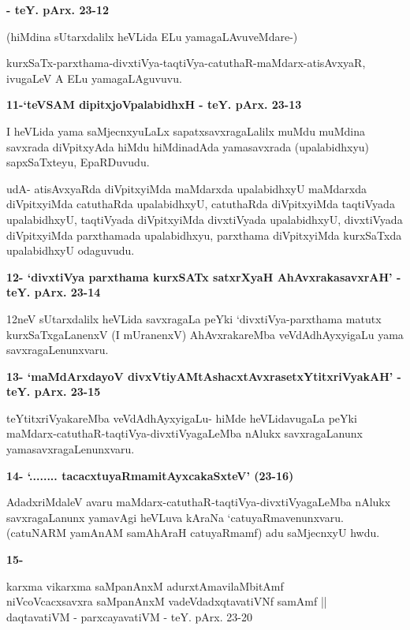 \textbf{- teY. pArx. 23-12}

\smallskip
(hiMdina sUtarxdalilx heVLida ELu yamagaLAvuveMdare-)

kurxSaTx-parxthama-divxtiVya-taqtiVya-catuthaR-maMdarx-atisAvxyaR, ivugaLeV A ELu yamagaLAgu\-vuvu.

\eject

\noindent
\textbf{11-`teVSAM dipitxjoVpalabidhxH - teY. pArx. 23-13}

\smallskip
I heVLida yama saMjecnxyuLaLx sapatxsavxragaLalilx muMdu muMdina savxrada diVpitx\-yAda hiMdu hiMdina\-dAda yamasavxrada (upalabidhxyu) sapxSaTxteyu, EpaRDu\-vudu. 

udA- atisAvxyaRda diVpitx\-yiMda maMdarxda upalabidhxyU maMdarxda diVpitxyiMda catuthaRda upalabidhxyU, catuthaRda diVpitxyiMda taqtiV\-yada upalabidhxyU, taqtiVyada diVpitxyiMda divxtiVyada upalabidhxyU, divxtiVyada diVpitx\-yiMda parxtha\-mada upalabidhxyu, parxthama diVpitxyiMda kurxSaTxda upalabidhxyU odaguvudu.

\medskip
\noindent
\textbf{12- `divxtiVya parxthama kurxSATx satxrXyaH AhAvxrakasavxrAH' - teY. pArx. 23-14}

\smallskip
12neV sUtarxdalilx heVLida savxragaLa peYki `divxtiVya-parxthama matutx kurxSaTxgaLanenxV (I mUranenxV) AhAvxraka\-reMba veVdAdhAyxyigaLu yama savxragaLenunxvaru.

\medskip
\noindent
\textbf{13- `maMdArxdayoV divxVtiyAMtAshacxtAvxrasetxYtitxriVyakAH' - teY. pArx. 23-15}

\smallskip
teYtitxriVyakareMba veVdAdhAyxyigaLu- hiMde heVLidavugaLa peYki maMdarx-\-catuthaR-taqtiVya-divxtiV\-ya\-gaLeMba nAlukx savxragaLanunx yamasavxragaLenunxvaru.

\medskip
\noindent
\textbf{14- `........ tacacxtuyaRmamitAyxcakaSxteV' (23-16)}

\smallskip
AdadxriMdaleV avaru maMdarx-catuthaR-taqtiVya-divxtiVyagaLeMba nAlukx savxragaLanunx yamavAgi heVLuva kAraNa `catuyaRmavenunxvaru. (catuNARM yamAnAM samAhAraH catuyaR\-mamf) adu saMjecnxyU hwdu.

\medskip
\noindent
\textbf{15-}

\begin{shloka}
karxma vikarxma saMpanAnxM adurxtAmavilaMbitAmf\\
niVcoVcacxsavxra saMpanAnxM vadeVdadxqtavatiVNf samAmf ||\\
daqtavatiVM - parxcayavatiVM - teY. pArx. 23-20
\end{shloka}

